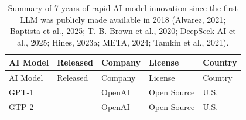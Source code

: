 \documentclass[
  letterpaper,
  DIV=11,
  numbers=noendperiod]{scrartcl}
\begin{document}
\begin{longtable}[]{@{}
  >{\raggedright\arraybackslash}p{}
  >{\raggedright\arraybackslash}p{}
  >{\raggedright\arraybackslash}p{}
  >{\raggedright\arraybackslash}p{}
  >{\raggedright\arraybackslash}p{}@{}}
\caption{Summary of 7 years of rapid AI model innovation since the first
LLM was publicly made available in 2018 (Alvarez, 2021; Baptista et al.,
2025; T. B. Brown et al., 2020; DeepSeek-AI et al., 2025; Hines, 2023a;
META, 2024; Tamkin et al., 2021).}\tabularnewline
\toprule\noalign{}
\begin{minipage}[b]{\linewidth}\raggedright
AI Model
\end{minipage} & \begin{minipage}[b]{\linewidth}\raggedright
Released
\end{minipage} & \begin{minipage}[b]{\linewidth}\raggedright
Company
\end{minipage} & \begin{minipage}[b]{\linewidth}\raggedright
License
\end{minipage} & \begin{minipage}[b]{\linewidth}\raggedright
Country
\end{minipage} \\
\midrule\noalign{}
\endfirsthead
\toprule\noalign{}
\begin{minipage}[b]{\linewidth}\raggedright
AI Model
\end{minipage} & \begin{minipage}[b]{\linewidth}\raggedright
Released
\end{minipage} & \begin{minipage}[b]{\linewidth}\raggedright
Company
\end{minipage} & \begin{minipage}[b]{\linewidth}\raggedright
License
\end{minipage} & \begin{minipage}[b]{\linewidth}\raggedright
Country
\end{minipage} \\
\midrule\noalign{}
\endhead
\bottomrule\noalign{}
\endlastfoot
GPT-1 & 2018 & OpenAI & Open Source & U.S. \\
GTP-2 & 2019 & OpenAI & Open Source & U.S. \\

\end{longtable}
\end{document}
